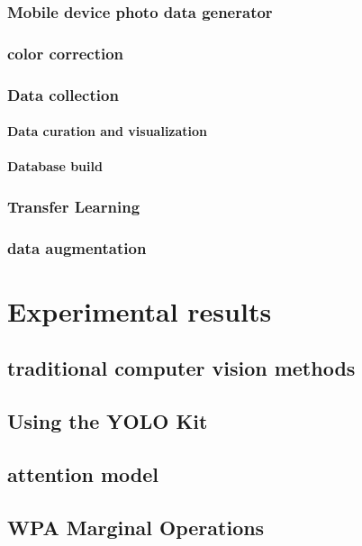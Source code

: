 \documentclass{article}
\begin{document}
\subsubsection{Mobile device photo data generator}
\subsubsection{color correction}
\subsubsection{Data collection}

\paragraph{Data curation and visualization}

\paragraph{Database build}

\subsubsection{Transfer Learning}

\subsubsection{data augmentation}

\section{Experimental results}


\subsection{traditional computer vision methods}
\subsection{Using the YOLO Kit}
\subsection{attention model}
\subsection{WPA Marginal Operations}
\end{document}

